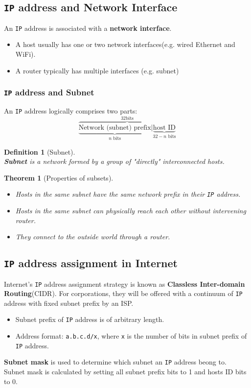 \documentclass[12pt]{article}
\newcommand\IP{\texttt{IP} }
\newtheorem{definition}{Definition}[section]
\newtheorem{theorem}{Theorem}[section]
\theoremstyle{definition}
\begin{document}
\subsection{\IP address and Network Interface}
An \IP address is associated with a \textbf{network interface}.
\begin{itemize}
  \item A host usually has one or two network interfaces(e.g. wired Ethernet and WiFi).
  \item A router typically has multiple interfaces (e.g. subnet)
\end{itemize}
\subsubsection{\IP address and Subnet}
An \IP address logically comprises two parts:
\[
\overbrace{\underbrace{\text{Network (subnet) prefix}}_{n \text{ bits}}|\underbrace{\text{host ID}}_{32-n \text{ bits}}}^{32 \text{bits}}
\]
\begin{definition}[Subnet]\hfill\\\normalfont
\textbf{Subnet} is a network formed by a group of "directly" interconnected hosts.
\end{definition}
\begin{theorem}[Properties of subsets]
\hfill\\\normalfont
\begin{itemize}
  \item Hosts in the same subnet have the \textit{same} network prefix in their \IP address.
  \item Hosts in the same subnet can physically reach each other \textit{without} intervening router.
  \item They connect to the outside world through a router.
  \end{itemize}
\end{theorem}
\subsection{\IP address assignment in Internet}
Internet's \IP address assignment strategy is known as \textbf{Classless Inter-domain Routing}(CIDR). For corporations, they will be offered with a continuum of \IP address with fixed subnet prefix by an ISP.
\begin{itemize}
  \item Subnet prefix of \IP address is of arbitrary length.
  \item Address format: \texttt{a.b.c.d/x}, where \texttt{x} is the number of bits in subnet prefix of \IP address.
\end{itemize}
\textbf{Subnet mask} is used to determine which subnet an \IP address beong to.\\Subnet mask is calculated by setting all subnet prefix bits to 1 and hosts ID bits to 0.
\end{document}
